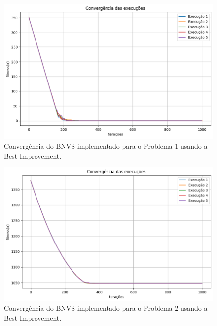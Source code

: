 \documentclass[
	12pt,				%
	oneside,			%
	a4paper,			%
	chapter=TITLE,
	sumario=tradicional,
	english,			%
	brazil				%
]{abntex2}
\begin{document}
\begin{figure}[h!]
	\caption{\label{fig:bestImprovement_p1}Convergência do BNVS implementado para o Problema 1 usando a Best Improvement.}
	\begin{center}
    \includegraphics[width=\textwidth,trim=1 1 1 1,clip]{bestImprovement_p1.png}
	\end{center}
\end{figure}

\begin{figure}[h!]
	\caption{\label{fig:bestImprovement_p2}Convergência do BNVS implementado para o Problema 2 usando a Best Improvement.}
	\begin{center}
    \includegraphics[width=\textwidth,trim=1 1 1 1,clip]{bestImprovement_p2.png}
	\end{center}
\end{figure}
\end{document}
